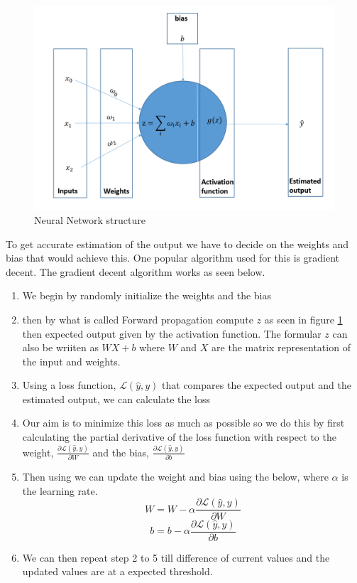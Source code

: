 \begin{figure}
  \includegraphics[width=\linewidth, scale=0.2]{neuron.PNG}
  \caption{Neural Network structure}
  \label{fig:neuron}
\end{figure}

To get accurate estimation of the output we have to decide on the weights and bias that would achieve this. One popular algorithm used for this is gradient decent. The gradient decent algorithm works as seen below. 
\begin{enumerate}
 \item  We begin by randomly initialize the weights and the bias
  \item then by what is called Forward propagation compute $z$ as seen in figure \ref{fig:neuron} then expected output given by the activation function. The formular $z$ can also be wriiten as $WX +b$ where  $W$ and $X$ are the matrix representation of the input and weights.
  \item Using a loss function, $\mathcal{L}(\hat{y},y)$ that compares the expected output and the estimated output, we can calculate the loss
  \item Our aim is to minimize this loss as much as possible so we do this by first calculating the partial derivative of the loss function with respect to the weight, $\frac{\partial \mathcal{L}(\hat{y},y)}{\partial W}$ and the bias, $\frac{\partial \mathcal{L}(\hat{y},y)}{\partial b}$
    \item Then using we can update the weight and bias using the below, where $\alpha$ is the learning rate.
\[W = W - \alpha \frac{\partial \mathcal{L}(\hat{y},y)}{\partial W}\]
\[b = b - \alpha \frac{\partial \mathcal{L}(\hat{y},y)}{\partial b}\]
\item We can then repeat step 2 to 5 till difference of current values and the updated values are at a expected threshold.
\end{enumerate}

